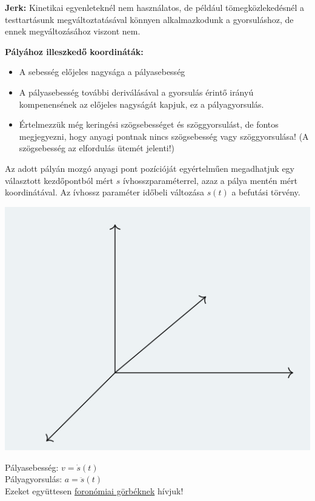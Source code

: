 \begin{tcolorbox}[colback=MidnightBlue!5!white,colframe=MidnightBlue!60!black,title= Definíció]
\textbf{Jerk:} Kinetikai egyenleteknél nem használatos, de például tömegközlekedésnél a testtartásunk megváltoztatásával könnyen alkalmazkodunk a gyorsuláshoz, de ennek megváltozásához viszont nem.
\end{tcolorbox}
 \textbf{Pályához illeszkedő koordináták:}
\begin{itemize}
    \item A sebesség előjeles nagysága a pályasebesség
    \item A pályasebesség további deriválásával a gyorsulás érintő irányú kompenensének az előjeles nagyságát kapjuk, ez a pályagyorsulás.
    \item Értelmezzük még keringési szögsebességet és szöggyorsulást, de fontos megjegyezni, hogy anyagi pontnak nincs szögsebesség vagy szöggyorsulása! (A szögsebesség az elfordulás ütemét jelenti!)
\end{itemize}
\begin{tcolorbox}[colback=MidnightBlue!5!white,colframe=MidnightBlue!60!black,title= Definíció]
Az adott pályán mozgó anyagi pont pozícióját egyértelműen megadhatjuk egy választott kezdőpontból mért \(s\) ívhosszparaméterrel, azaz a pálya mentén mért koordinátával. Az ívhossz paraméter időbeli változása \(s(t)\) a befutási törvény.
\begin{multicols}{2}
    \includegraphics[scale = 0.7]{Ea_gyak_1/2.png}
    \columnbreak

  Pályasebesség: \(v=\dot{s}(t)\)\\
  Pályagyorsulás: \(a = \ddot{s}(t)\)\\
  Ezeket együttesen \underline{foronómiai görbéknek} hívjuk!
\end{multicols}
\end{tcolorbox}
